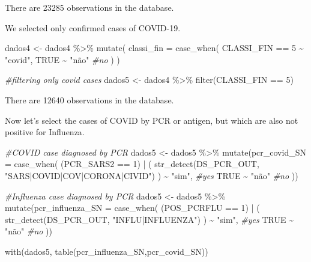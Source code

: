 \documentclass[
]{article}
\newenvironment{Shaded}{\begin{snugshade}}{\end{snugshade}}
\newcommand{\AttributeTok}[1]{\textcolor[rgb]{0.77,0.63,0.00}{#1}}
\newcommand{\CommentTok}[1]{\textcolor[rgb]{0.56,0.35,0.01}{\textit{#1}}}
\newcommand{\ConstantTok}[1]{\textcolor[rgb]{0.00,0.00,0.00}{#1}}
\newcommand{\DecValTok}[1]{\textcolor[rgb]{0.00,0.00,0.81}{#1}}
\newcommand{\FunctionTok}[1]{\textcolor[rgb]{0.00,0.00,0.00}{#1}}
\newcommand{\NormalTok}[1]{#1}
\newcommand{\OtherTok}[1]{\textcolor[rgb]{0.56,0.35,0.01}{#1}}
\newcommand{\SpecialCharTok}[1]{\textcolor[rgb]{0.00,0.00,0.00}{#1}}
\newcommand{\StringTok}[1]{\textcolor[rgb]{0.31,0.60,0.02}{#1}}
\begin{document}
There are 23285 observations in the database.

We selected only confirmed cases of COVID-19.

\begin{Shaded}
\begin{Highlighting}[]
\NormalTok{dados4 }\OtherTok{\textless{}{-}}\NormalTok{ dados4 }\SpecialCharTok{\%\textgreater{}\%} 
  \FunctionTok{mutate}\NormalTok{(}
    \AttributeTok{classi\_fin =} \FunctionTok{case\_when}\NormalTok{(}
\NormalTok{      CLASSI\_FIN }\SpecialCharTok{==} \DecValTok{5} \SpecialCharTok{\textasciitilde{}} \StringTok{"covid"}\NormalTok{,}
      \ConstantTok{TRUE} \SpecialCharTok{\textasciitilde{}} \StringTok{"não"} \CommentTok{\#no}
\NormalTok{    )}
\NormalTok{  )}


\CommentTok{\#filtering only covid cases }
\NormalTok{dados5 }\OtherTok{\textless{}{-}}\NormalTok{ dados4 }\SpecialCharTok{\%\textgreater{}\%} 
    \FunctionTok{filter}\NormalTok{(CLASSI\_FIN }\SpecialCharTok{==} \DecValTok{5}\NormalTok{)}
\end{Highlighting}
\end{Shaded}

There are 12640 observations in the database.

Now let's select the cases of COVID by PCR or antigen, but which are
also not positive for Influenza.

\begin{Shaded}
\begin{Highlighting}[]
\CommentTok{\#COVID case diagnosed by PCR}
\NormalTok{dados5 }\OtherTok{\textless{}{-}}\NormalTok{ dados5 }\SpecialCharTok{\%\textgreater{}\%}
  \FunctionTok{mutate}\NormalTok{(}\AttributeTok{pcr\_covid\_SN =} \FunctionTok{case\_when}\NormalTok{(}
\NormalTok{    (PCR\_SARS2 }\SpecialCharTok{==} \DecValTok{1}\NormalTok{) }\SpecialCharTok{|}
\NormalTok{      (}
        \FunctionTok{str\_detect}\NormalTok{(DS\_PCR\_OUT, }\StringTok{"SARS|COVID|COV|CORONA|CIVID"}\NormalTok{) }
\NormalTok{      ) }\SpecialCharTok{\textasciitilde{}} \StringTok{"sim"}\NormalTok{, }\CommentTok{\#yes}
    \ConstantTok{TRUE} \SpecialCharTok{\textasciitilde{}} \StringTok{"não"} \CommentTok{\#no}
\NormalTok{  ))}

\CommentTok{\#Influenza case diagnosed by PCR }
\NormalTok{dados5 }\OtherTok{\textless{}{-}}\NormalTok{ dados5 }\SpecialCharTok{\%\textgreater{}\%}
  \FunctionTok{mutate}\NormalTok{(}\AttributeTok{pcr\_influenza\_SN =} \FunctionTok{case\_when}\NormalTok{(}
\NormalTok{    (POS\_PCRFLU }\SpecialCharTok{==} \DecValTok{1}\NormalTok{) }\SpecialCharTok{|}
\NormalTok{      (}
        \FunctionTok{str\_detect}\NormalTok{(DS\_PCR\_OUT, }\StringTok{"INFLU|INFLUENZA"}\NormalTok{) }
\NormalTok{      ) }\SpecialCharTok{\textasciitilde{}} \StringTok{"sim"}\NormalTok{, }\CommentTok{\#yes}
    \ConstantTok{TRUE} \SpecialCharTok{\textasciitilde{}} \StringTok{"não"} \CommentTok{\#no}
\NormalTok{  ))}

\FunctionTok{with}\NormalTok{(dados5, }\FunctionTok{table}\NormalTok{(pcr\_influenza\_SN,pcr\_covid\_SN))}
\end{Highlighting}
\end{Shaded}
\end{document}
